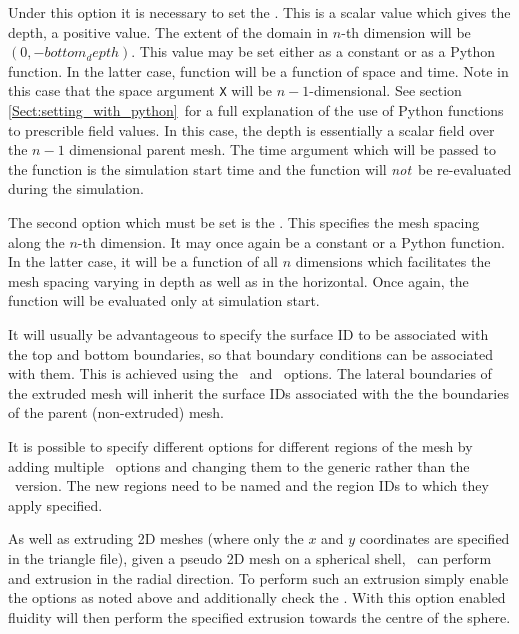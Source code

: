 Under this option it is necessary to set the . This is
a scalar value which gives the depth, a positive value. The extent of the
domain in $n$-th dimension will be $(0,-bottom_depth)$. This value may be
set either as a constant or as a Python function. In the latter case,
function will be a function of space and time. Note in this case that the
space argument \lstinline[language=Python]+X+ will be $n-1$-dimensional. See
section \ref{Sect:setting_with_python}\ for a full explanation of the use of Python functions to
prescrible field values. In this case, the depth is essentially a scalar
field over the $n-1$ dimensional parent mesh. The time argument which
will be passed to the function is the simulation start time and the function
will \emph{not}\ be re-evaluated during the simulation.

The second option which must be set is the
. This specifies the mesh spacing
along the $n$-th dimension. It may once again be a constant or a Python
function. In the latter case, it will be a function of all $n$ dimensions
which facilitates the mesh spacing varying in depth as well as in the
horizontal. Once again, the function will be evaluated only at simulation
start. 

It will usually be advantageous to specify the surface ID to be associated
with the top and bottom boundaries, so that boundary conditions can be
associated with them. This is achieved using the
\ and
\ options. The lateral boundaries
of the extruded mesh will inherit the surface IDs associated with the the
boundaries of the parent (non-extruded) mesh.

It is possible to specify different options for different regions of the
mesh by adding multiple \ options and changing
them to the generic rather than the \
version. The new regions need to be named and the region IDs to which they
apply specified.

As well as extruding 2D meshes (where only the $x$ and $y$ coordinates are
specified in the triangle file), given a pseudo 2D mesh on a spherical
shell, \fluidity\ can perform and extrusion in the radial direction. To
perform such an extrusion simply enable the options as noted above and
additionally check the \option{/geometry/spherical\_earth option}. With this
option enabled fluidity will then perform the specified extrusion towards
the centre of the sphere.

